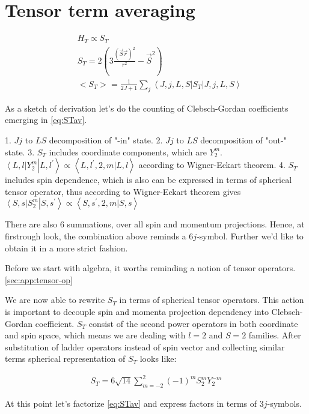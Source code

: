 \section{Tensor term averaging} \label{sec:app:tensor-term}

\begin{align}
    &H_T \propto S_T \\
    &S_T = 2(3\frac{(\vec{S}\vec{r})^2}{r^2} - \vec{S}^2) \\
    &<S_T> = \frac{1}{2J+1} \sum_{j} \left<J, j, L, S\right| S_T \left|J, j, L, S\right> \label{eq:STav}
\end{align}

As a sketch of derivation let's do the counting of Clebsch-Gordan coefficients
emerging in \cref{eq:STav}.

1. $Jj$ to $LS$ decomposition of "-in" state.
2. $Jj$ to $LS$ decomposition of "out-" state.
3. $S_T$ includes coordinate components, which are $Y_2^m$.
$\left<L, l\right| Y_2^m \left|L,l^\prime\right> \propto \left<L, l^\prime, 2, m| L, l \right>$
according to Wigner-Eckart theorem.
4. $S_T$ includes spin dependence, which is also can be expressed in terms of
spherical tensor operator, thus according to Wigner-Eckart theorem gives
$\left<S, s\right| S_{2}^m \left|S, s^\prime \right> \propto \left<S, s^\prime, 2, m| S, s\right>$

There are also $6$ summations, over all spin and momentum projections.
Hence, at firstrough look, the combination above reminds a $6j$-symbol.
Further we'd like to obtain it in a more strict fashion.

Before we start with algebra, it worths reminding a notion of tensor operators.\cref{sec:app:tensor-op}

We are now able to rewrite $S_T$ in terms of spherical tensor operators.
This action is important to decouple spin and momenta projection dependency
into Clebsch-Gordan coefficient. $S_T$ consist of the second power operators
in both coordinate and spin space, which means we are dealing
with $l=2$ and $S=2$ families. After substitution of ladder operators
instead of spin vector and collecting similar terms spherical representation
of $S_T$ looks like:

\begin{align}
    S_T = 6 \sqrt{14} \sum_{m=-2}^{2} (-1)^m S_{2}^{m} Y_{2}^{-m}
\end{align}

At this point let's factorize \cref{eq:STav} and express factors in terms
of $3j$-symbols.

